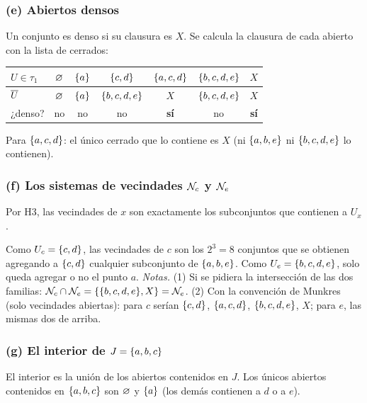 \subsubsection*{(e) Abiertos densos}
Un conjunto es denso si su clausura es $X$. Se calcula la clausura de cada abierto con la lista de cerrados:
\begin{center}\small\renewcommand{\arraystretch}{1.15}
\begin{tabular}{@{}lcccccc@{}}\toprule
$U\in\tau_1$ & $\varnothing$ & $\{a\}$ & $\{c,d\}$ & $\{a,c,d\}$ & $\{b,c,d,e\}$ & $X$\\ \midrule
$\overline{U}$ & $\varnothing$ & $\{a\}$ & $\{b,c,d,e\}$ & $X$ & $\{b,c,d,e\}$ & $X$\\
¿denso? & no & no & no & \textbf{sí} & no & \textbf{sí}\\ \bottomrule
\end{tabular}\end{center}
Para $\{a,c,d\}$: el único cerrado que lo contiene es $X$ (ni $\{a,b,e\}$ ni $\{b,c,d,e\}$ lo contienen).

\subsubsection*{(f) Los sistemas de vecindades $\mathcal{N}_c$ y $\mathcal{N}_e$}
Por H3, las vecindades de $x$ son exactamente los subconjuntos que contienen a $U_x$.

Como $U_c=\{c,d\}$, las vecindades de $c$ son los $2^3=8$ conjuntos que se obtienen agregando a $\{c,d\}$ cualquier
subconjunto de $\{a,b,e\}$. Como $U_e=\{b,c,d,e\}$, solo queda agregar o no el punto $a$.
\emph{Notas.} (1) Si se pidiera la intersección de las dos familias: $\mathcal{N}_c\cap\mathcal{N}_e=\{\{b,c,d,e\},X\}=\mathcal{N}_e$.
(2) Con la convención de Munkres (solo vecindades abiertas): para $c$ serían $\{c,d\}$, $\{a,c,d\}$, $\{b,c,d,e\}$,
$X$; para $e$, las mismas dos de arriba.

\subsubsection*{(g) El interior de $J=\{a,b,c\}$}
El interior es la unión de los abiertos contenidos en $J$. Los únicos abiertos contenidos en $\{a,b,c\}$ son $\varnothing$
y $\{a\}$ (los demás contienen a $d$ o a $e$).

